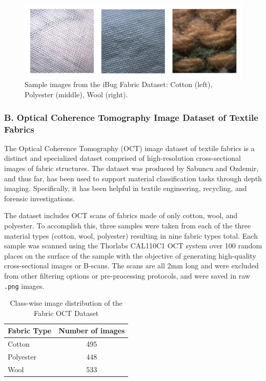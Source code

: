 \begin{figure}[H]
    \centering
    \begin{minipage}{0.8\linewidth}
        \includegraphics[width=\linewidth]{images/iBugDataset}
    \end{minipage}
    \caption[Sample images from the iBug Fabric Dataset]{Sample images from the iBug Fabric Dataset: Cotton (left), Polyester (middle), Wool (right).}
\end{figure}

\subsubsection{B. Optical Coherence Tomography Image Dataset of Textile Fabrics~\cite{sabuncu2022optical}}

The Optical Coherence Tomography (OCT) image dataset of textile fabrics is a distinct and specialized dataset comprised of high-resolution cross-sectional images of fabric structures. The dataset was produced by Sabuncu and Ozdemir, and thus far, has been used to support material classification tasks through depth imaging. Specifically, it has been helpful in textile engineering, recycling, and forensic investigations. 

The dataset includes OCT scans of fabrics made of only cotton, wool, and polyester. To accomplish this, three samples were taken from each of the three material types (cotton, wool, polyester) resulting in nine fabric types total. Each sample was scanned using the Thorlabs CAL110C1 OCT system over 100 random places on the surface of the sample with the objective of generating high-quality cross-sectional images or B-scans. The scans are all 2mm long and were excluded from other filtering options or pre-processing protocols, and were saved in raw \texttt{.png} images.

\begin{table}[H]
\centering
\caption{Class-wise image distribution of the Fabric OCT Dataset}
\begin{tabular}{|l|c|}
\hline
\textbf{Fabric Type} & \textbf{Number of images} \\
\hline
Cotton & 495 \\
Polyester & 448 \\
Wool & 533 \\
\hline
\end{tabular}
\end{table}

